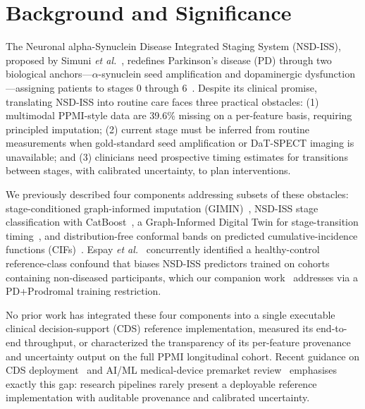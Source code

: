 
\section{Background and Significance}
\label{p6:sec:background}

The Neuronal alpha-Synuclein Disease Integrated Staging System (NSD-ISS), proposed by Simuni \textit{et al.}~\cite{simuni2024}, redefines Parkinson's disease (PD) through two biological anchors---$\alpha$-synuclein seed amplification and dopaminergic dysfunction---assigning patients to stages 0 through 6~\cite{simuni2024,simuni2025progression}. Despite its clinical promise, translating NSD-ISS into routine care faces three practical obstacles: (1) multimodal PPMI-style data are 39.6\% missing on a per-feature basis, requiring principled imputation; (2) current stage must be inferred from routine measurements when gold-standard seed amplification or DaT-SPECT imaging is unavailable; and (3) clinicians need prospective timing estimates for transitions between stages, with calibrated uncertainty, to plan interventions.

We previously described four components addressing subsets of these obstacles: stage-conditioned graph-informed imputation (GIMIN)~\cite{dupre2026paper2}, NSD-ISS stage classification with CatBoost~\cite{dupre2026paper1}, a Graph-Informed Digital Twin for stage-transition timing~\cite{dupre2026paper3}, and distribution-free conformal bands on predicted cumulative-incidence functions (CIFs)~\cite{dupre2026paper3}. Espay \textit{et al.}~\cite{espay2025refutation} concurrently identified a healthy-control reference-class confound that biases NSD-ISS predictors trained on cohorts containing non-diseased participants, which our companion work~\cite{dupre2026paper1} addresses via a PD+Prodromal training restriction.

No prior work has integrated these four components into a single executable clinical decision-support (CDS) reference implementation, measured its end-to-end throughput, or characterized the transparency of its per-feature provenance and uncertainty output on the full PPMI longitudinal cohort. Recent guidance on CDS deployment~\cite{kawamoto2005cdss,sendak2020deployment,wiens2019clinicalml,finlayson2021clinician} and AI/ML medical-device premarket review~\cite{fda2024pccp,collins2024tripodai} emphasises exactly this gap: research pipelines rarely present a deployable reference implementation with auditable provenance and calibrated uncertainty.


